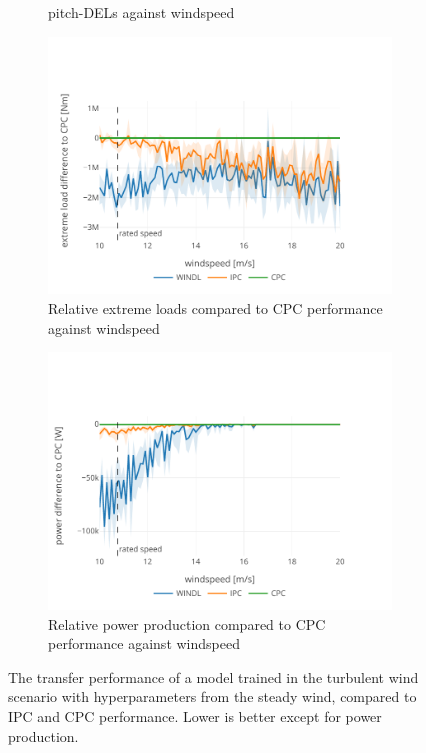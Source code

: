 \begin{figure}[hbt!]
\begin{subfigure}[b]{0.48\textwidth}
      \caption{pitch-DELs against windspeed}
      \label{fig:naive-sweep-pdel}
  \end{subfigure}
  \begin{subfigure}[b]{0.48\textwidth}
    \centering
    \includegraphics[width=\textwidth]{images/naive_sweep_extreme.pdf}
    \caption{Relative extreme loads compared to CPC performance against windspeed}
    \label{fig:naive-sweep-extreme}
\end{subfigure}
\begin{subfigure}[b]{0.48\textwidth}
    \centering
    \includegraphics[width=\textwidth]{images/naive_sweep_power.pdf}
    \caption{Relative power production compared to CPC performance against windspeed}
    \label{fig:naive-sweep-power}
\end{subfigure}
  \caption{The transfer performance of a model trained in the turbulent wind scenario with hyperparameters from the steady wind, compared to IPC and CPC performance. Lower is better except for power production.}
  \label{fig:naive-sweep}
\end{figure}


